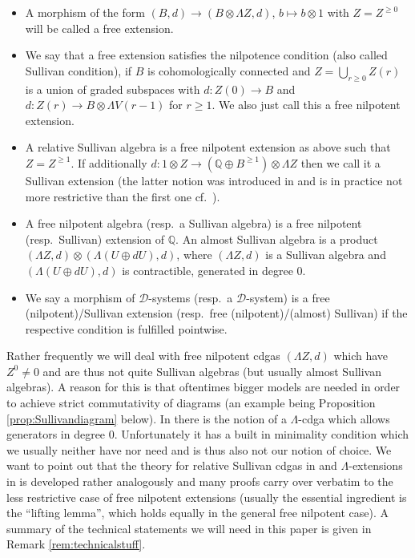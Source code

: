\documentclass[12pt,a4paper]{article}
\theoremstyle{definition}
\begin{document}
\begin{itemize}
\item A morphism of the form $(B,d)\rightarrow (B\otimes \Lambda Z,d)$, $b\mapsto b\otimes 1$ with $Z=Z^{\geq 0}$ will be called a free extension.

\item We say that a free extension satisfies the nilpotence condition (also called Sullivan condition), if $B$ is cohomologically connected and $Z=\bigcup_{r\geq 0} Z(r)$ is a union of graded subspaces with $d\colon Z(0)\rightarrow B$ and $d\colon Z(r)\rightarrow B\otimes \Lambda V(r-1)$ for $r\geq 1$. We also just call this a free nilpotent extension.

\item A relative Sullivan algebra is a free nilpotent extension as above such that $Z=Z^{\geq 1}$. If additionally $d\colon 1\otimes Z\rightarrow (\mathbb{Q}\oplus B^{\geq 1})\otimes \Lambda Z$ then we call it a Sullivan extension (the latter notion was introduced in \cite{BibelII} and is in practice not more restrictive than the first one cf.\ \cite[Lemma 14.8]{BibelI}).

\item A free nilpotent algebra (resp.\ a Sullivan algebra) is a free nilpotent (resp.\ Sullivan) extension of $\mathbb{Q}$. An almost Sullivan algebra is a product $(\Lambda Z,d)\otimes (\Lambda (U\oplus dU),d)$, where $(\Lambda Z,d)$ is a Sullivan algebra and $(\Lambda(U\oplus dU),d)$ is contractible, generated in degree $0$.

\item We say a morphism of $\mathcal{D}$-systems (resp.\ a $\mathcal{D}$-system) is a free (nilpotent)/Sullivan extension (resp.\ free (nilpotent)/(almost) Sullivan) if the respective condition is fulfilled pointwise.
\end{itemize}


Rather frequently we will deal with free nilpotent cdgas $(\Lambda Z,d)$ which have $Z^0\neq 0$ and are thus not quite Sullivan algebras (but usually almost Sullivan algebras). A reason for this is that oftentimes bigger models are needed in order to achieve strict commutativity of diagrams (an example being Proposition \ref{prop:Sullivandiagram} below). In \cite{BibelII} there is the notion of a $\Lambda$-cdga which allows generators in degree $0$. Unfortunately it has a built in minimality condition which we usually neither have nor need and is thus also not our notion of choice. We want to point out that the theory for relative Sullivan cdgas in \cite{BibelI} and $\Lambda$-extensions in \cite{BibelII} is developed rather analogously and many proofs carry over verbatim to the less restrictive case of free nilpotent extensions (usually the essential ingredient is the ``lifting lemma'', which holds equally in the general free nilpotent case). A summary of the technical statements we will need in this paper is given in Remark \ref{rem:technicalstuff}.
\end{document}
